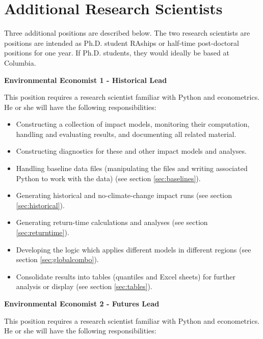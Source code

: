 \documentclass[12pt, oneside]{amsart}
\begin{document}
\section{Additional Research Scientists}

Three additional positions are described below.  The two research scientists are positions are intended as Ph.D. student RAships or half-time post-doctoral positions for one year.  If Ph.D. students, they would ideally be based at Columbia.

{\bf Environmental Economist 1 - Historical Lead}

This position requires a research scientist familiar with Python and econometrics.  He or she will have the following responsibilities:

\begin{itemize}
\item Constructing a collection of impact models, monitoring their computation, handling and evaluating results, and documenting all related material.
\item Constructing diagnostics for these and other impact models and analyses.
\item Handling baseline data files (manipulating the files and writing associated Python to work with the data) (see section \ref{sec:baselines}).
\item Generating historical and no-climate-change impact runs (see section \ref{sec:historical}).
\item Generating return-time calculations and analyses (see section \ref{sec:returntime}).
\item Developing the logic which applies different models in different regions (see section \ref{sec:globalcombo}).
\item Consolidate results into tables (quantiles and Excel sheets) for further analysis or display (see section \ref{sec:tables}).
\end{itemize}

{\bf Environmental Economist 2 - Futures Lead}

This position requires a research scientist familiar with Python and econometrics.  He or she will have the following responsibilities:
\end{document}
